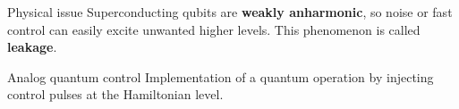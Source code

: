\documentclass{beamer}
\begin{document}
\begin{frame}
\begin{columns}
\begin{figure}[t]



            \end{figure}
        \end{columns}
        \begin{alertblock}{Physical issue}
        \scriptsize
Superconducting qubits are \textbf{weakly anharmonic}, so noise or fast control can easily excite unwanted higher levels. This phenomenon is called \textbf{leakage}. 
\end{alertblock}
        \begin{block}{Analog quantum control}
        \scriptsize
        Implementation of a quantum operation by injecting control pulses at the Hamiltonian level.
        \end{block}
\end{frame}

\end{document}
